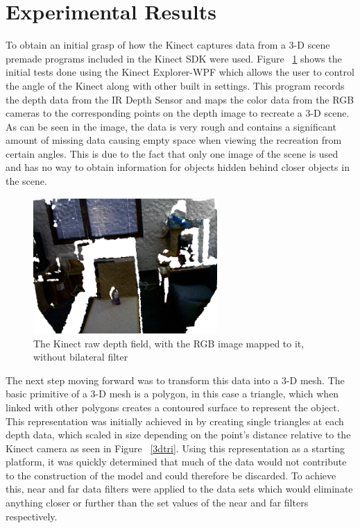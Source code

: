 \documentclass[pdftex,10.5pt]{report}
\begin{document}
\section{Experimental Results}
To obtain an initial grasp of how the Kinect captures data from a 3-D scene premade programs included in the Kinect SDK were used. Figure ~\ref{waterbot}  shows the initial tests done using the Kinect Explorer-WPF which allows the user to control the angle of the Kinect along with other built in settings. This program records the depth data from the IR Depth Sensor and maps the color data from the RGB cameras to the corresponding points on the depth image to recreate a 3-D scene. As can be seen in the image, the data is very rough and contains a significant amount of missing data causing empty space when viewing the recreation from certain angles. This is due to the fact that only one image of the scene is used and has no way to obtain information for objects hidden behind closer objects in the scene.

\begin{figure}[H]
	\centering
	\includegraphics[width=70mm]{figures/kinectwaterbottle.png}
	\caption{The Kinect raw depth field, with the RGB image mapped to it, without bilateral filter}
	\label{waterbot}
\end{figure}

The next step moving forward was to transform this data into a 3-D mesh. The basic primitive of a 3-D mesh is a polygon, in this case a triangle, which when linked with other polygons creates a contoured surface to represent the object. This representation was initially achieved in by creating single triangles at each depth data, which scaled in size depending on the point's distance relative to the Kinect camera as seen in Figure ~\ref{3dtri}. Using this representation as a starting platform, it was quickly determined that much of the data would not contribute to the construction of the model and could therefore be discarded. To achieve this, near and far data filters were applied to the data sets which would eliminate anything closer or further than the set values of the near and far filters respectively.
\end{document}
